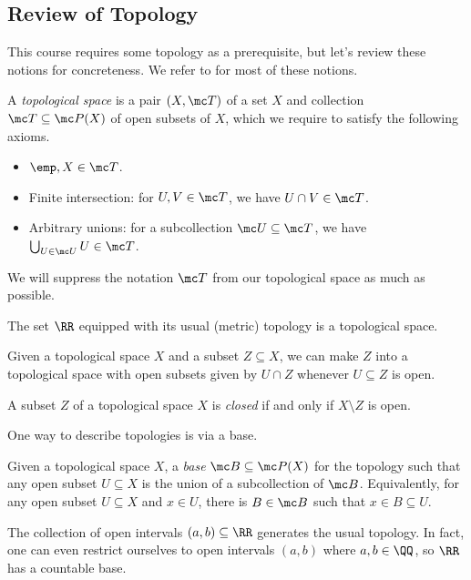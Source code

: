 \documentclass[../notes.tex]{subfiles}
\begin{document}
\subsection{Review of Topology}
This course requires some topology as a prerequisite, but let's review these notions for concreteness. We refer to \cite{elber-top} for most of these notions.
\begin{definition}
	A \textit{topological space} is a pair $(X,\mc T)$ of a set $X$ and collection $\mc T\subseteq\mc P(X)$ of open subsets of $X$, which we require to satisfy the following axioms.
	\begin{itemize}
		\item $\emp,X\in\mc T$.
		\item Finite intersection: for $U,V\in\mc T$, we have $U\cap V\in\mc T$.
		\item Arbitrary unions: for a subcollection $\mc U\subseteq\mc T$, we have $\bigcup_{U\in\mc U}U\in\mc T$.
	\end{itemize}
	We will suppress the notation $\mc T$ from our topological space as much as possible.
\end{definition}
\begin{example}
	The set $\RR$ equipped with its usual (metric) topology is a topological space.
\end{example}
\begin{example}
	Given a topological space $X$ and a subset $Z\subseteq X$, we can make $Z$ into a topological space with open subsets given by $U\cap Z$ whenever $U\subseteq Z$ is open.
\end{example}
\begin{definition}[closed]
	A subset $Z$ of a topological space $X$ is \textit{closed} if and only if $X\setminus Z$ is open.
\end{definition}
One way to describe topologies is via a base.
\begin{definition}[base]
	Given a topological space $X$, a \textit{base} $\mc B\subseteq\mc P(X)$ for the topology such that any open subset $U\subseteq X$ is the union of a subcollection of $\mc B$. Equivalently, for any open subset $U\subseteq X$ and $x\in U$, there is $B\in\mc B$ such that $x\in B\subseteq U$.
\end{definition}
\begin{example}
	The collection of open intervals $(a,b)\subseteq\RR$ generates the usual topology. In fact, one can even restrict ourselves to open intervals $(a,b)$ where $a,b\in\QQ$, so $\RR$ has a countable base.
\end{example}
\end{document}
